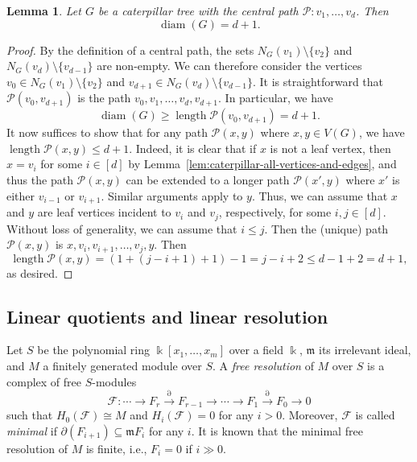 \documentclass{amsart}
\newtheorem{lemma}[theorem]{Lemma}
\theoremstyle{remark}
\theoremstyle{definition}
\DeclareMathOperator{\diam}{diam}
\DeclareMathOperator{\length}{length}
\begin{document}
	\begin{lemma}\label{lem:caterpillar-diameter}
		Let  $G$ be a caterpillar tree with the central path $\mathcal{P}\colon v_1,\dots, v_d$. Then \[\diam(G)=d+1.\]
	\end{lemma}
	
	\begin{proof}
		By the definition of a central path, the sets $N_G(v_1)\setminus \{v_2\}$ and $N_G(v_d)\setminus \{v_{d-1}\}$ are non-empty. We can therefore consider the vertices $v_0\in N_G(v_1)\setminus \{v_2\}$ and $v_{d+1}\in N_G(v_d)\setminus \{v_{d-1}\}$. It is straightforward that $\mathcal{P}(v_0,v_{d+1})$ is the path $v_0,v_1,\dots, v_d,v_{d+1}$. In particular, we have
		\[
		\diam(G)\geq \length \mathcal{P}(v_0,v_{d+1}) = d+1.
		\]
		It now suffices to show that for any path $\mathcal{P}(x,y)$ where $x,y\in V(G)$, we have $\length \mathcal{P}(x,y) \leq d+1$. Indeed, it is clear that if $x$ is not a leaf vertex, then $x=v_i$ for some $i\in [d]$ by Lemma~\ref{lem:caterpillar-all-vertices-and-edges}, and thus the path $\mathcal{P}(x,y)$ can be extended to a longer path $\mathcal{P}(x',y)$ where $x'$ is either $v_{i-1}$ or $v_{i+1}$. Similar arguments apply to $y$. Thus, we can assume that $x$ and $y$ are leaf vertices incident to $v_i$ and $v_j$, respectively, for some $i,j\in [d]$. Without loss of generality, we can assume that $i\leq j$. Then the (unique) path $\mathcal{P}(x,y)$ is $x,v_i,v_{i+1},\dots, v_j, y$. Then
		\[
		\length \mathcal{P}(x,y)= (1+(j-i+1)+1)-1= j-i+2 \leq d-1+2 = d+1,
		\]
		as desired.
	\end{proof}
	\color{black}
    \fi
	
	
	
	\subsection{Linear quotients and linear resolution}
	
	Let $S$ be the polynomial ring $\Bbbk[x_1,\dots, x_m]$ over a field $\Bbbk$, $\mathfrak{m}$ its irrelevant ideal, and $M$ a finitely generated module over $S$. A \emph{free resolution} of $M$ over $S$ is a complex of free $S$-modules
	\[
	\mathcal{F}\colon \cdots \to F_r\xrightarrow{\partial} F_{r-1} \to \cdots \to F_1 \xrightarrow{\partial} F_0\to 0
	\]
	such that $H_0(\mathcal{F})\cong M$ and $H_i(\mathcal{F})=0$ for any $i>0$. Moreover, $\mathcal{F}$ is called \emph{minimal} if $\partial(F_{i+1})\subseteq \mathfrak{m}F_{i}$ for any $i$. It is known that the minimal free resolution of $M$ is finite, i.e., $F_i=0$ if $i\gg 0$.
	
\end{document}
